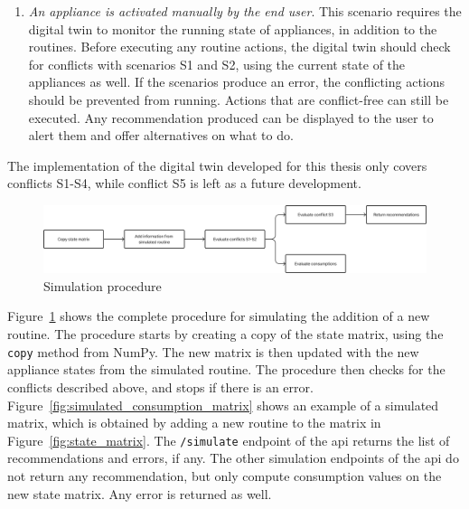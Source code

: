 \begin{enumerate}[label={\textit{S\arabic*.}}, leftmargin=3.5em]
    \item \textit{An appliance is activated manually by the end user}. This scenario requires the digital twin to monitor the running state of appliances, in addition to the routines. Before executing any routine actions, the digital twin should check for conflicts with scenarios S1 and S2, using the current state of the appliances as well. If the scenarios produce an error, the conflicting actions should be prevented from running. Actions that are conflict-free can still be executed. Any recommendation produced can be displayed to the user to alert them and offer alternatives on what to do.
\end{enumerate}

The implementation of the digital twin developed for this thesis only covers conflicts S1-S4, while conflict S5 is left as a future development.

\begin{figure}
    \centering
    \includegraphics[width=\textwidth]{images/simulation_procedure.png}
    \caption{Simulation procedure}
    \label{fig:simulation_procedure}
\end{figure}

Figure~\ref{fig:simulation_procedure} shows the complete procedure for simulating the addition of a new routine. The procedure starts by creating a copy of the state matrix, using the \texttt{copy} method from NumPy. The new matrix is then updated with the new appliance states from the simulated routine. The procedure then checks for the conflicts described above, and stops if there is an error. Figure~\ref{fig:simulated_consumption_matrix} shows an example of a simulated matrix, which is obtained by adding a new routine to the matrix in Figure~\ref{fig:state_matrix}. The \texttt{/simulate} endpoint of the \acrshort{api} returns the list of recommendations and errors, if any. The other simulation endpoints of the \acrshort{api} do not return any recommendation, but only compute consumption values on the new state matrix. Any error is returned as well.

